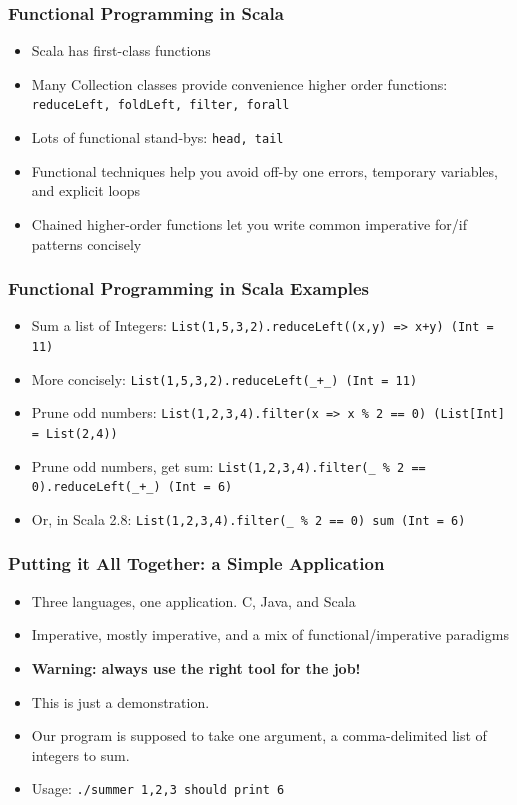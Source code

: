 \documentclass[hyperref={colorlinks=true}]{beamer}
\begin{document}
\begin{frame} 
\frametitle{Functional Programming in Scala}
\begin{itemize}
  \item<1-> Scala has first-class functions
  \item<2-> Many Collection classes provide convenience higher order functions: \tt\small{reduceLeft, foldLeft, filter, forall}
  \item<3-> Lots of functional stand-bys: \tt\small{head, tail}
  \item<4-> Functional techniques help you avoid off-by one errors, temporary variables, and explicit loops
  \item<5-> Chained higher-order functions let you write common imperative for/if patterns concisely
\end{itemize}
\end{frame} 

\begin{frame} 
\frametitle{Functional Programming in Scala Examples}
\begin{itemize}
  \item<1-> Sum a list of Integers: \tt{List(1,5,3,2).reduceLeft((x,y) => x+y) (Int = 11)}
  \item<2-> More concisely: \tt{List(1,5,3,2).reduceLeft(\_+\_) (Int = 11)}
  \item<3-> Prune odd numbers: \tt{List(1,2,3,4).filter(x => x \% 2 == 0) (List[Int] = List(2,4))}
  \item<4-> Prune odd numbers, get sum: \tt{List(1,2,3,4).filter(\_ \% 2 == 0).reduceLeft(\_+\_) (Int = 6)}
  \item<5-> Or, in Scala 2.8: \tt{List(1,2,3,4).filter(\_ \% 2 == 0) sum (Int = 6)}
\end{itemize}
\end{frame} 

\begin{frame} 
\frametitle{Putting it All Together: a Simple Application}
\begin{itemize}
  \item<1-> Three languages, one application. C, Java, and Scala
  \item<2-> Imperative, mostly imperative, and a mix of functional/imperative paradigms
  \item<3-> \textbf{Warning: always use the right tool for the job!}
  \item<4-> This is just a demonstration.
  \item<5-> Our program is supposed to take one argument, a comma-delimited list of integers to sum.
  \item<6-> Usage: \tt{./summer 1,2,3} should print 6
\end{itemize}
\end{frame} 
\end{document}
